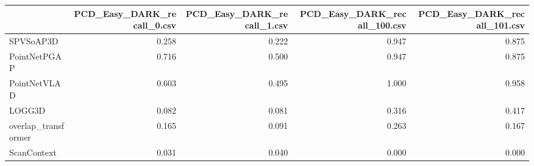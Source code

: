 \begin{tabular}{lrrrr}
\hline
&PCD\_Easy\_DARK\_recall\_0.csv&PCD\_Easy\_DARK\_recall\_1.csv&PCD\_Easy\_DARK\_recall\_100.csv&PCD\_Easy\_DARK\_recall\_101.csv\\
\hline
SPVSoAP3D&0.258&0.222&0.947&0.875\\
PointNetPGAP&0.716&0.500&0.947&0.875\\
PointNetVLAD&0.603&0.495&1.000&0.958\\
LOGG3D&0.082&0.081&0.316&0.417\\
overlap\_transformer&0.165&0.091&0.263&0.167\\
ScanContext&0.031&0.040&0.000&0.000\\
\hline
\end{tabular}